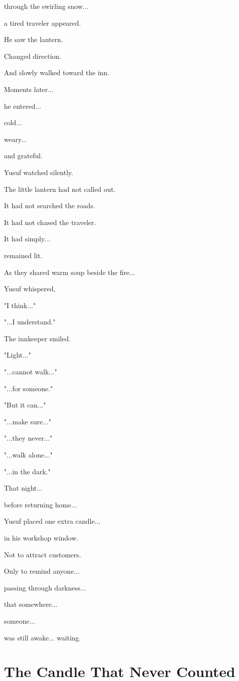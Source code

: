 \documentclass[12pt,openany]{book}
\begin{document}
through the swirling snow...

a tired traveler appeared.

He saw the lantern.

Changed direction.

And slowly walked toward the inn.

Moments later...

he entered...

cold...

weary...

and grateful.

Yusuf watched silently.

The little lantern had not called out.

It had not searched the roads.

It had not chased the traveler.

It had simply...

remained lit.

As they shared warm soup beside the fire...

Yusuf whispered,

"I think..."

"...I understand."

The innkeeper smiled.

"Light..."

"...cannot walk..."

"...for someone."

"But it can..."

"...make sure..."

"...they never..."

"...walk alone..."

"...in the dark."

That night...

before returning home...

Yusuf placed one extra candle...

in his workshop window.

Not to attract customers.

Only to remind anyone...

passing through darkness...

that somewhere...

someone...

was still awake...
waiting.
\section*{The Candle That Never Counted}
\end{document}

